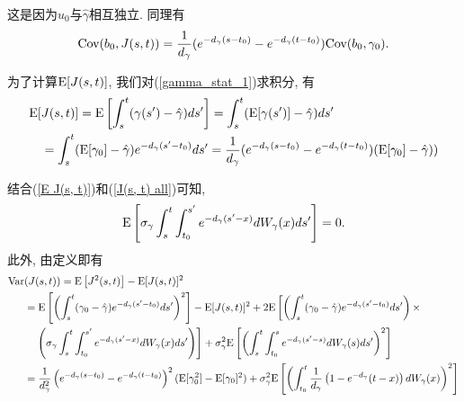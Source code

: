 \documentclass[notitlepage,cs4size,punct,oneside]{ctexrep}
\numberwithin{equation}{section}
\theoremstyle{mystyle}
\begin{document}
这是因为$u_0$与$\hat{\gamma}$相互独立. 同理有
\begin{equation} \label{Cov b0 J(s, t)}
\text{Cov}(b_0, J(s, t)) = \frac{1}{d_\gamma}(e^{-d_\gamma(s-t_0)}-e^{-d_\gamma(t-t_0)})\text{Cov}(b_0, \gamma_0).
\end{equation}

为了计算$\text{E}[J(s, t)]$, 我们对(\ref{gamma_stat_1})求积分, 有
\begin{equation} \label{E J(s, t)}
\begin{split}
\text{E}[&J(s, t)] = \text{E}\left[\int_s^t (\gamma(s')-\hat{\gamma})ds'\right] = \int_s^t (\text{E}[\gamma(s')]-\hat{\gamma})ds' \\
&= \int_s^t (\text{E}[\gamma_0]-\hat{\gamma})e^{-d_\gamma(s'-t_0)}ds' = \frac{1}{d_\gamma}(e^{-d_\gamma(s-t_0)}-e^{-d_\gamma(t-t_0)})(\text{E}[\gamma_0]-\hat{\gamma}))
\end{split}
\end{equation}

结合(\ref{E J(s, t)})和(\ref{J(s, t) all})可知,
\[
\text{E}\left[\sigma_\gamma\int_s^t\int_{t_0}^{s'}e^{-d_\gamma(s'-x)}dW_\gamma(x)ds'\right] = 0.
\]
此外, 由定义即有
\[
\begin{split}
\text{Var}&(J(s, t)) = \text{E}\left[J^2(s, t)\right] - \text{E}[J(s, t)]^2 \\
&= \text{E}\left[\left(\int_s^t (\gamma_0-\hat{\gamma})e^{-d_\gamma(s'-t_0)}ds'\right)^2\right] - \text{E}[J(s, t)]^2 + 2\text{E}\left[\left(\int_s^t(\gamma_0-\hat{\gamma})e^{-d_\gamma(s'-t_0)}ds'\right)\times\right. \\
&\quad\left.\left(\sigma_\gamma\int_s^t\int_{t_0}^{s'}e^{-d_\gamma(s'-x)}dW_\gamma(x)ds'\right)\right] + \sigma_\gamma^2\text{E}\left[\left(\int_s^t\int_{t_0}^{s}e^{-d_\gamma(s'-s)}dW_\gamma(s)ds'\right)^2\right] \\
&= \frac{1}{d_\gamma^2}\left(e^{-d_\gamma(s-t_0)}-e^{-d_\gamma(t-t_0)}\right)^2(\text{E}[\gamma_0^2]-\text{E}[\gamma_0]^2) + \sigma_\gamma^2\text{E}\left[\left(\int_{t_0}^t \frac{1}{d_\gamma}\left(1-e^{-d_\gamma}(t-x)\right)dW_\gamma(x)\right)^2\right]
\end{split}
\]
\end{document}

